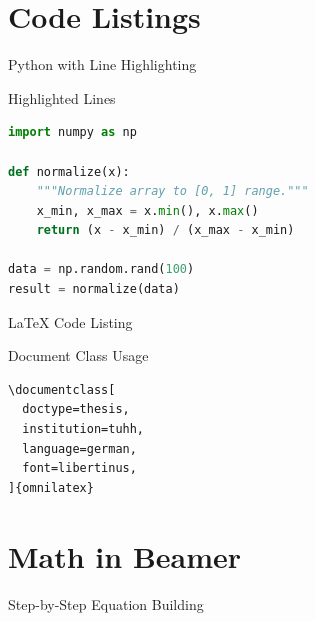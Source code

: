 \documentclass[
  doctype=beamer,
  beameraspectratio=169,
  beamertheme=Madrid,
  institution=generic,
]{omnilatex}
\begin{document}
\section{Code Listings}

\begin{frame}[fragile]{Python with Line Highlighting}
  \begin{block}{Highlighted Lines}
    \begin{lstlisting}[language=Python, highlightlines={3-5}]
import numpy as np

def normalize(x):
    """Normalize array to [0, 1] range."""
    x_min, x_max = x.min(), x.max()
    return (x - x_min) / (x_max - x_min)

data = np.random.rand(100)
result = normalize(data)
    \end{lstlisting}
  \end{block}
\end{frame}

\begin{frame}[fragile]{LaTeX Code Listing}
  \begin{block}{Document Class Usage}
    \begin{lstlisting}[language={[LaTeX]TeX}, basicstyle=\ttfamily\scriptsize]
\documentclass[
  doctype=thesis,
  institution=tuhh,
  language=german,
  font=libertinus,
]{omnilatex}
    \end{lstlisting}
  \end{block}
\end{frame}

\section{Math in Beamer}

\begin{frame}{Step-by-Step Equation Building}

  \vspace{1em}
\end{frame}
\end{document}
